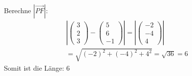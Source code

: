 \begin{itemize}
Berechne $|\overrightarrow{PF}|$: 
\[ 
\begin{gathered}
    |\begin{pmatrix}
        3 \\ 2 \\ 3
    \end{pmatrix}
    -
    \begin{pmatrix}
        5 \\ 6 \\ -1
    \end{pmatrix}|
    =
    |
    \begin{pmatrix}
        -2 \\ -4 \\ 4
    \end{pmatrix}
    |
    \\
    = 
    \sqrt{(-2)^2 + (-4)^2 + 4^2} = \sqrt{36} = 6
\end{gathered}
\]
Somit ist die Länge: $6$

\end{itemize}

